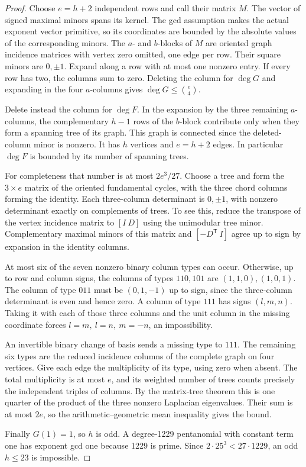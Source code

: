 \documentclass[11pt]{article}
\begin{document}
\begin{proof}
Choose \(e=h+2\) independent rows and call their matrix \(M\).
The vector of signed maximal minors spans its kernel. The gcd
assumption makes the actual exponent vector primitive, so its
coordinates are bounded by the absolute values of the corresponding
minors. The \(a\)- and \(b\)-blocks of \(M\) are oriented graph
incidence matrices with vertex zero omitted, one edge per row.
Their square minors are \(0,\pm1\). Expand along a row with at most
one nonzero entry. If every row has two, the columns sum to zero.
Deleting the column for \(\deg G\) and expanding in
the four \(a\)-columns gives \(\deg G\le\binom e4\).

Delete instead the column for \(\deg F\). In the expansion by the
three remaining \(a\)-columns, the complementary \(h-1\) rows of
the \(b\)-block contribute only when they form a spanning tree of
its graph. This graph is connected since the deleted-column minor
is nonzero. It has \(h\) vertices and \(e=h+2\) edges. In particular
\(\deg F\) is bounded by its number of spanning trees.

For completeness that number is at most \(2e^3/27\). Choose a tree
and form the \(3\times e\) matrix of the oriented fundamental
cycles, with the three chord columns forming the identity. Each
three-column determinant is \(0,\pm1\), with nonzero determinant
exactly on complements of trees. To see this, reduce the transpose
of the vertex incidence matrix to \([I\ D]\) using the unimodular
tree minor. Complementary maximal minors of this matrix and
\([-D^{\mathsf T}\ I]\) agree up to sign by expansion in the identity
columns.

At most six of the seven nonzero binary column types can occur.
Otherwise, up to row and column signs, the columns of types
\(110,101\) are \((1,1,0),(1,0,1)\). The column of type \(011\)
must be \((0,1,-1)\) up to sign, since the three-column determinant
is even and hence zero. A column of type \(111\) has signs
\((l,m,n)\). Taking it with each of those three columns and the
unit column in the missing coordinate forces \(l=m,\ l=n,\ m=-n\),
an impossibility.

An invertible binary change of basis sends a missing type to \(111\).
The remaining six types are the reduced incidence columns of the
complete graph on four vertices. Give each edge the multiplicity of
its type, using zero when absent. The total multiplicity is at most
\(e\), and its weighted number of trees counts precisely the independent
triples of columns. By the matrix-tree theorem this is one quarter
of the product of the three nonzero Laplacian eigenvalues. Their sum
is at most \(2e\), so the arithmetic--geometric mean inequality gives
the bound.

Finally \(G(1)=1\), so \(h\) is odd. A degree-1229 pentanomial with
constant term one has exponent gcd one because 1229 is prime.
Since \(2\cdot25^3<27\cdot1229\), an odd \(h\le23\) is impossible.
\end{proof}
\end{document}
